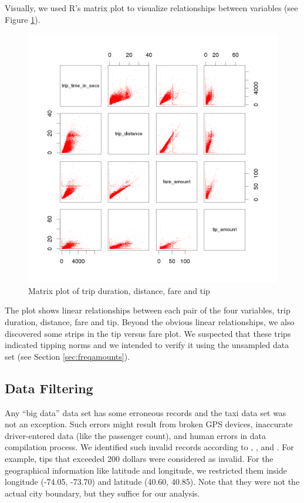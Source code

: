 \documentclass[12pt,a4paper]{article}
\begin{document}
  Visually, we used R's matrix plot to visualize relationships between variables (see Figure \ref{fig:rmatrixplot}). 

  \begin{figure}[h]
    \centering
    \caption{Matrix plot of trip duration, distance, fare and tip}
    \label{fig:rmatrixplot}
    \includegraphics[scale=0.3]{plot/matrixplot}
  \end{figure}

  The plot shows linear relationships between each pair of the four variables, trip duration, distance, fare and tip. Beyond the obvious linear relationships, we also discovered some strips in the tip versus fare plot. We suspected that these trips indicated tipping norms and we intended to verify it using the unsampled data set (see Section \ref{sec:freqamounts}).

  \subsection{Data Filtering}
  \label{sec:filtering}
  Any ``big data'' data set has some erroneous records and the taxi data set was not an exception. Such errors might result from broken GPS devices, inaccurate driver-entered data (like the passenger count), and human errors in data compilation process. We identified such invalid records according to \cite{nyctaxidatadict}, \cite{andrewj}, and \cite{hafenwebsite}. For example, tips that exceeded 200 dollars were considered as invalid. For the geographical information like latitude and longitude, we restricted them inside longitude (-74.05, -73.70) and latitude (40.60, 40.85). Note that they were not the actual city boundary, but they suffice for our analysis. 
\end{document}

